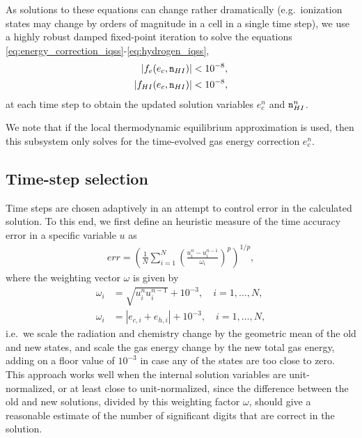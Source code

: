\documentclass[letterpaper,10pt]{article}
\renewcommand{\(}{\left(}
\renewcommand{\)}{\right)}
\newcommand{\mn}{{\tt n}}
\begin{document}
As solutions to these equations can change rather dramatically
(e.g.~ionization states may change by orders of magnitude in a cell in
a single time step), we use a highly robust damped fixed-point
iteration to solve the equations
\eqref{eq:energy_correction_iqss}-\eqref{eq:hydrogen_iqss},
\begin{equation}
  \label{eq:nonlinear_system}
  \begin{split}
  |f_e(e_c,\mn_{HI})| &< 10^{-8}, \\
  |f_{HI}(e_c,\mn_{HI})| &< 10^{-8},
  \end{split}
\end{equation}
at each time step to obtain the updated solution variables $e_c^n$ and
$\mn_{HI}^n$.

We note that if the local thermodynamic equilibrium approximation is
used, then this subsystem only solves for the time-evolved gas energy
correction $e_c^n$.




\subsection{Time-step selection}
\label{sec:dt_selection}

Time steps are chosen adaptively in an attempt to control error in the
calculated solution.  To this end, we first define an heuristic
measure of the time accuracy error in a specific variable $u$ as
\begin{align}
\label{eq:time_error}
  err = \left(\frac1N \sum_{i=1}^N
    \left(\frac{u_i^{n}-u_i^{n-1}}{\omega_i}\right)^p\right)^{1/p}, 
\end{align}
where the weighting vector $\omega$ is given by
\begin{align}
\label{eq:time_weighting}
  \omega_i &= \sqrt{u_i^n u_i^{n-1}} + 10^{-3}, \quad i=1,\ldots,N, \\
  \omega_i &= |e_{c,i} + e_{h,i}| + 10^{-3}, \quad i=1,\ldots,N,
\end{align}
i.e.~we scale the radiation and chemistry change by the geometric mean
of the old and new states, and scale the gas energy change by the new
total gas energy, adding on a floor value of $10^{-3}$ in case any
of the states are too close to zero.  This approach works well when
the internal solution variables are unit-normalized, or at least close
to unit-normalized, since the difference between the old and new
solutions, divided by this weighting factor $\omega$, should give a
reasonable estimate of the number of significant digits that are
correct in the solution. 
\end{document}
